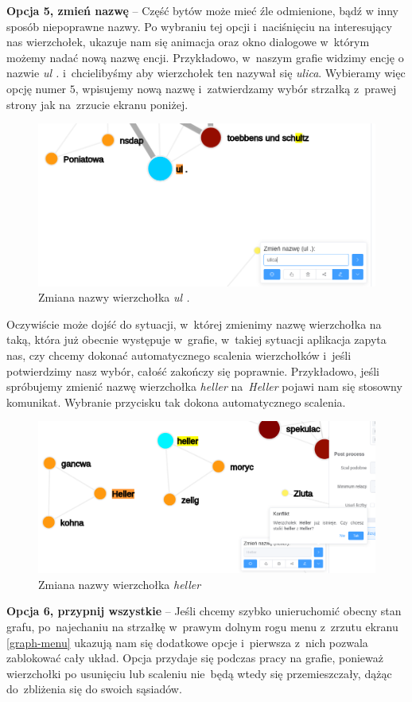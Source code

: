 \documentclass[12pt, a4paper]{article}
\begin{document}
\noindent \textbf{Opcja 5, zmień nazwę} -- Część bytów może mieć źle odmienione, bądź w inny sposób niepoprawne nazwy. Po wybraniu tej opcji i~naciśnięciu na interesujący nas wierzchołek, ukazuje nam się animacja oraz okno dialogowe w~którym możemy nadać nową nazwę encji. Przykładowo, w~naszym grafie widzimy encję o nazwie \textit{ul .} i~chcielibyśmy aby wierzchołek ten nazywał się \textit{ulica}. Wybieramy więc opcję numer $5$, wpisujemy nową nazwę i~zatwierdzamy wybór strzałką z~prawej strony jak na~zrzucie ekranu poniżej.

\begin{figure}[H]
  \centering
  \includegraphics[width=0.7\linewidth]{images/graph-ulica.png}
  \caption{Zmiana nazwy wierzchołka \textit{ul .}}
\end{figure}

Oczywiście może dojść do sytuacji, w~której zmienimy nazwę wierzchołka na taką, która już obecnie występuje w~grafie, w~takiej sytuacji aplikacja zapyta nas, czy chcemy dokonać automatycznego scalenia wierzchołków i~jeśli potwierdzimy nasz wybór, całość zakończy się poprawnie. Przykładowo, jeśli spróbujemy zmienić nazwę wierzchołka \textit{heller} na~\textit{Heller} pojawi nam się stosowny komunikat. Wybranie przycisku tak dokona automatycznego scalenia.

\begin{figure}[H]
  \centering
  \includegraphics[width=0.7\linewidth]{images/graph-change-name-heller.png}
  \caption{Zmiana nazwy wierzchołka \textit{heller}}
\end{figure}


\noindent \textbf{Opcja 6, przypnij wszystkie} -- Jeśli chcemy szybko unieruchomić obecny stan grafu, po~najechaniu na strzałkę w~prawym dolnym rogu menu z~zrzutu ekranu \ref{graph-menu} ukazują nam się dodatkowe opcje i~pierwsza z~nich pozwala zablokować cały układ. Opcja przydaje się podczas pracy na grafie, ponieważ wierzchołki po usunięciu lub scaleniu nie~będą wtedy się przemieszczały, dążąc do~zbliżenia się do swoich sąsiadów.\\
\end{document}
